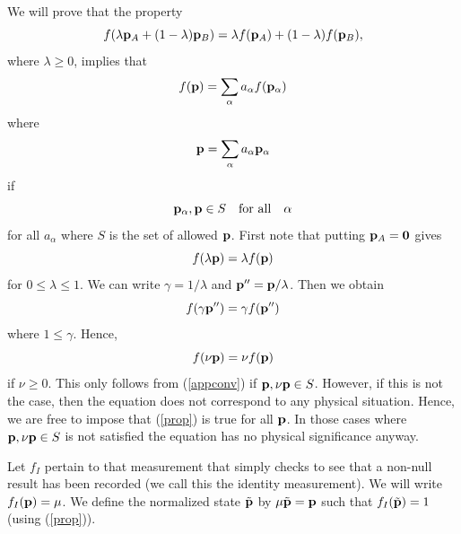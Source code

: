 \documentclass[12pt]{article}
\begin{document}
\vspace{6mm}


\vspace{6mm}

We will prove that the property
\begin{equation}\label{appconv}
f(\lambda {\bf p}_A + (1-\lambda) {\bf p}_B)=
\lambda f({\bf p}_A) + (1-\lambda) f({\bf p}_B),
\end{equation}
where $\lambda\geq 0$, implies that
\begin{equation}\label{linearproperty}
f({\bf p})=\sum_\alpha a_\alpha f({\bf p}_\alpha)
\end{equation}
where
\begin{equation}\label{palphastate}
{\bf p}=\sum_\alpha a_\alpha {\bf p}_\alpha
\end{equation}
if
\[ {\bf p}_\alpha, {\bf p}\in S  ~~~{\rm for~all}~~~ \alpha\]
for all $a_\alpha$ where $S$ is the set of allowed ${\bf p}$.
First note that putting ${\bf p}_A={\bf 0}$ gives
\begin{equation}
f(\lambda {\bf p})=\lambda f({\bf p})
\end{equation}
for $ 0\leq \lambda \leq 1$.  We can write $\gamma=1/\lambda$ and ${\bf
p}'' = {\bf p}/\lambda$.  Then we obtain
\begin{equation}
f(\gamma {\bf p}'')=\gamma f({\bf p}'')
\end{equation}
where $1\leq\gamma$.  Hence,
\begin{equation} \label{prop}
f(\nu {\bf p})=\nu f({\bf p})
\end{equation}
if $ \nu \geq 0$.  This only follows from (\ref{appconv}) if ${\bf p}, \nu{\bf
p} \in S$.  However, if this is not the case, then the equation does not
correspond to any physical situation. Hence, we are free to impose that
(\ref{prop}) is true for all ${\bf p}$.  In those cases where
${\bf p}, \nu{\bf p} \in S$ is not satisfied the equation has no
physical significance anyway.

Let $f_I$ pertain to that measurement that simply checks to see that a
non-null result has been recorded (we call this the identity
measurement). We will
write $f_I({\bf p})=\mu$.  We define the normalized state $\tilde{\bf
p}$ by $\mu\tilde{\bf p}={\bf p}$ such that $f_I(\tilde{\bf p})=1$
(using (\ref{prop})).
\end{document}
